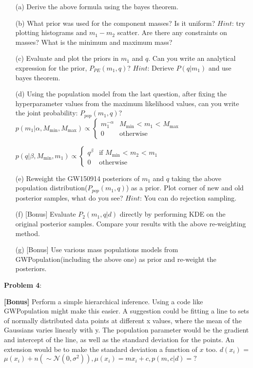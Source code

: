 \documentclass{article} %
\newcommand{\question}[2][]{\begin{flushleft}
        \textbf{Problem #1}: %
\end{flushleft}
}
\begin{document}
\begin{enumerate}
 	\item[(a)] Derive the above formula using the bayes theorem. 
	\item[(b)] What prior was used for the component masses? Is it uniform? $Hint$: try plotting histograms and $m_1-m_2$ scatter. Are there any constraints on masses? What is the minimum and maximum mass? 
	\item[(c)] Evaluate and plot the priors in $m_1$ and $q$. Can you write an analytical expression for the prior, $P_{PE}(m_1,q)$? $Hint$: Derieve $P(q|m_1)$ and use bayes theorem.
	\item[(d)] Using the population model from the last question, after fixing the hyperparameter values from the maximum likelihood values, can you write the joint probability: $P_{pop}(m_1,q)$? \\ 

$p(m_1|\alpha, M_\min, M_\max) \propto \begin{cases} m_1 ^ {-\alpha} & \text{$M_\min$ < $m_1$ < $M_\max$} \\ 0 & \text{otherwise}\end{cases}$

$p(q|\beta, M_\min, m_1) \propto \begin{cases}
q ^ {\beta} & \text{if $M_\min$ < $m_2$ < $m_1$} \\ 
0 & \text{otherwise}
\end{cases}$

\item[(e)]Reweight the GW150914 posteriors of $m_1$ and $q$ taking the above population distribution($P_{pop}(m_1,q)$) as a prior. Plot corner of new and old posterior samples, what do you see? $Hint$: You can do rejection sampling.

\item[(f)][Bonus] Evaluate $P_2(m_1,q|d)$ directly by performing KDE on the original posterior samples. Compare your results with the above re-weighting method.

\item[(g)][Bonus] Use various mass populations models from GWPopulation(including the above one) as prior and re-weight the posteriors.

        
    \end{enumerate}

	\question[4]{} \textbf{[Bonus]}
Perform a simple hierarchical inference. Using a code like GWPopulation might make this easier. A suggestion could be fitting a line to sets of normally distributed data points at different x values, where the mean of the Gaussians varies linearly with y. The population parameter would be the gradient and intercept of the line, as well as the standard deviation for the points. An extension would be to make the standard deviation a function of $x$ too. $d(x_i)$ = $\mu(x_i) + n( \sim \mathcal{N}(0, \sigma^2)) , \mu(x_i) = m x_i + c,   p(m,c|d)=?$
\end{document}
